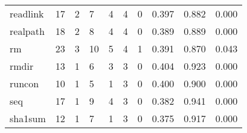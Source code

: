 \begin{longtable}{lp{2.0cm}p{2.0cm}p{2.0cm}p{2.0cm}p{2.0cm}p{2.0cm}p{2.0cm}p{2.0cm}p{2.0cm}}
readlink  &                     17 &                                             2 &                                            7 &                                           4 &                                            4 &                                          0 &                                0.397 &                                  0.882 &                                0.000 \\
realpath  &                     18 &                                             2 &                                            8 &                                           4 &                                            4 &                                          0 &                                0.389 &                                  0.889 &                                0.000 \\
rm        &                     23 &                                             3 &                                           10 &                                           5 &                                            4 &                                          1 &                                0.391 &                                  0.870 &                                0.043 \\
rmdir     &                     13 &                                             1 &                                            6 &                                           3 &                                            3 &                                          0 &                                0.404 &                                  0.923 &                                0.000 \\
runcon    &                     10 &                                             1 &                                            5 &                                           1 &                                            3 &                                          0 &                                0.400 &                                  0.900 &                                0.000 \\
seq       &                     17 &                                             1 &                                            9 &                                           4 &                                            3 &                                          0 &                                0.382 &                                  0.941 &                                0.000 \\
sha1sum   &                     12 &                                             1 &                                            7 &                                           1 &                                            3 &                                          0 &                                0.375 &                                  0.917 &                                0.000 \\

\end{longtable}
